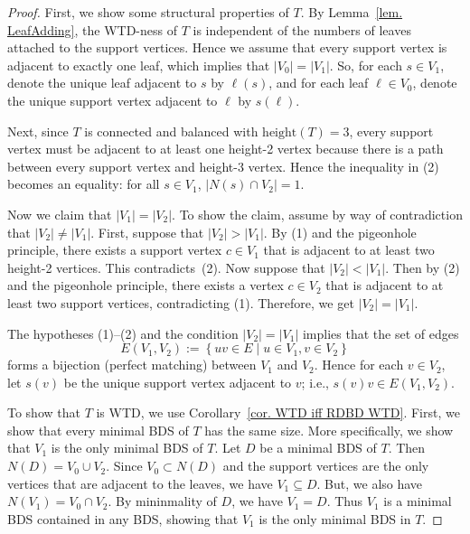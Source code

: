 \documentclass[12pt, reqno]{amsart}
\theoremstyle{definition}
\theoremstyle{plain}
\theoremstyle{definition}
\newcommand{\hh}{\mbox{height}}
\newcommand\Set[2]{\left\lbrace #1 \mid #2 \right\rbrace}
\begin{document}
\begin{proof}
First, we show some structural properties of $T$.
By Lemma~\ref{lem. LeafAdding}, the WTD-ness of $T$ is independent of the numbers of leaves attached to the support vertices.
Hence we assume that every support vertex is adjacent to exactly one leaf, which implies that $|V_0| = |V_1|$.
So, for each $s \in V_1$, denote the unique leaf adjacent to $s$ by $\ell(s)$, and for each leaf $\ell \in V_0$, denote the unique support vertex adjacent to $\ell$ by $s(\ell)$.

Next, since $T$ is connected and balanced with $\hh(T) = 3$, every support vertex must be adjacent to at least one height-2 vertex because there is a path between every support vertex and height-3 vertex.
Hence the inequality in (2) becomes an equality: for all $s \in V_1$, $|N(s) \cap V_2| = 1$.

Now we claim that $|V_1| = |V_2|$.
To show the claim, assume by way of contradiction that $|V_2| \neq |V_1|$.
First, suppose that $|V_2| > |V_1|$.
By (1) and the pigeonhole principle, there exists a support vertex $c \in V_1$ that is adjacent to at least two height-2 vertices.
This contradicts~(2).
Now suppose that $|V_2| < |V_1|$.
Then by (2) and the pigeonhole principle, there exists a vertex $c \in V_2$ that is adjacent to at least two support vertices, contradicting (1).
Therefore, we get $|V_2| = |V_1|$.

The hypotheses (1)--(2) and the condition $|V_2| = |V_1|$ implies that the set of edges 
$$
E(V_1,V_2) := \Set{uv \in E}{u \in V_1, v \in V_2}
$$
forms a bijection (perfect matching) between $V_1$ and $V_2$.
Hence for each $v \in V_2$, let $s(v)$ be the unique support vertex adjacent to $v$; i.e., $s(v)v \in E(V_1,V_2)$.

To show that $T$ is WTD, we use Corollary~\ref{cor. WTD iff RDBD WTD}.
First, we show that every minimal BDS of $T$ has the same size.
More specifically, we show that $V_1$ is the only minimal BDS of $T$.
Let $D$ be a minimal BDS of $T$.
Then $N(D) = V_0 \cup V_2$.
Since $V_0 \subset N(D)$ and the support vertices are the only vertices that are adjacent to the leaves, we have $V_1 \subseteq D$.
But, we also have $N(V_1) = V_0 \cap V_2$.
By mininmality of $D$, we have $V_1 = D$.
Thus $V_1$ is a minimal BDS contained in any BDS, showing that $V_1$ is the only minimal BDS in $T$.


\end{proof}
\end{document}

